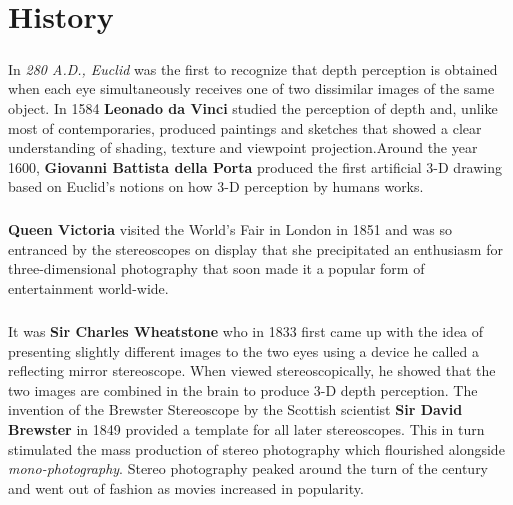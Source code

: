 \chapter{History}
\large{\paragraph{}In \emph{280 A.D., Euclid} was the first to recognize that depth perception is obtained when each eye simultaneously receives one of two dissimilar images of the same object. 
	In 1584 \textbf{Leonado da Vinci} studied the perception of depth and, unlike most of contemporaries, produced paintings and sketches that showed a clear understanding of shading, texture and viewpoint projection.Around the year 1600, \textbf{Giovanni Battista della Porta} produced the first artificial 3-D drawing based on Euclid’s notions on how 3-D perception by humans works.}
\large{\paragraph{}
\textbf{Queen Victoria} visited the World's Fair in London in 1851 and was so entranced by the stereoscopes on display that she precipitated an enthusiasm for three-dimensional photography that soon made it a popular form of entertainment world-wide.}
\large{\paragraph{}It was \textbf{Sir Charles Wheatstone} who in 1833 first came up with the idea of presenting slightly different images to the two eyes using a device he called a reflecting mirror stereoscope. When viewed stereoscopically, he showed that the two images are combined in the brain to produce 3-D depth perception. The invention of the Brewster Stereoscope by the Scottish scientist \textbf{Sir David Brewster} in 1849 provided a template for all later stereoscopes. This in turn stimulated the mass production of stereo photography which flourished alongside \emph{mono-photography}. Stereo photography peaked around the turn of the century and went out of fashion as movies increased in popularity.}